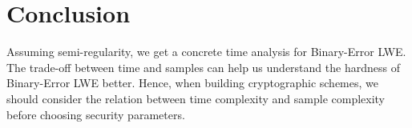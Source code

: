 \documentclass[a4paper]{article}
\theoremstyle{definition}
\theoremstyle{remark}
\begin{document}
\section{Conclusion}
Assuming semi-regularity, we get a concrete time analysis for Binary-Error LWE. The trade-off between time and samples can help us understand the hardness of Binary-Error LWE better. Hence, when building cryptographic schemes, we should consider the relation between time complexity and sample complexity before choosing security parameters. 

 
\end{document}
